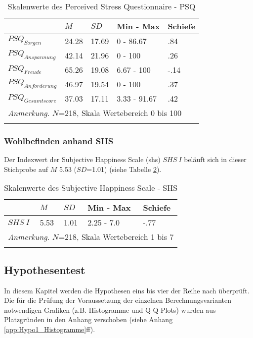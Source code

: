 \begin{table}[ht]
\begin{tabular}{m{6em} m{3em}  m{3em}  m{5em} m{3em}} 
  \hline
  & $M$ & $SD$ & Min - Max & Schiefe\\
  \hline
  $PSQ_{Sorgen}$ & 24.28 & 17.69 & 0 - 86.67 & .84 \\
  $PSQ_{Anspannung}$ & 42.14 & 21.96 & 0 - 100 & .26\\
  $PSQ_{Freude}$ & 65.26 & 19.08 & 6.67 - 100 & -.14\\
  $PSQ_{Anforderung}$ & 46.97 & 19.54 & 0 - 100 & .37 \\
  $PSQ_{Gesamtscore}$ & 37.03 & 17.11 & 3.33 - 91.67 & .42\\
  \hline
  \multicolumn{5}{l}{\textit{Anmerkung.} $N$=218, Skala Wertebereich 0 bis 100}\\
  &&&&\\
\end{tabular}
\caption{Skalenwerte des Perceived Stress Questionnaire - PSQ}
\label{table:PSQDeskriptiv}
\end{table}


\subsubsection{Wohlbefinden anhand SHS}
Der Indexwert der Subjective Happiness Scale (\acrshort{shs}) $SHS~I$ beläuft sich in dieser Stichprobe auf $M$ 5.53 ($SD$=1.01) (siehe Tabelle \ref{table:SHSDeskriptiv}).

\begin{table}[ht]
\begin{tabular}{m{6em} m{3em}  m{3em}  m{5em} m{3em}} 
  \hline
  & $M$ & $SD$ & Min - Max & Schiefe\\
  \hline
  $SHS~I$ & 5.53 & 1.01 & 2.25 - 7.0 & -.77 \\
  \hline
  \multicolumn{5}{l}{\textit{Anmerkung.} $N$=218, Skala Wertebereich 1 bis 7}\\
  &&&&\\
\end{tabular}
\caption{Skalenwerte des Subjective Happiness Scale - SHS}
\label{table:SHSDeskriptiv}
\end{table}

\subsection{Hypothesentest} \label{sec:Hypothesentest}
In diesem Kapitel werden die Hypothesen eins bis vier der Reihe nach überprüft. Die für die Prüfung der Voraussetzung der einzelnen Berechnungsvarianten notwendigen Grafiken (z.B. Histogramme und Q-Q-Plots) wurden aus Platzgründen in den Anhang verschoben (siehe Anhang \ref{app:Hypo1_Histogramme}ff).

